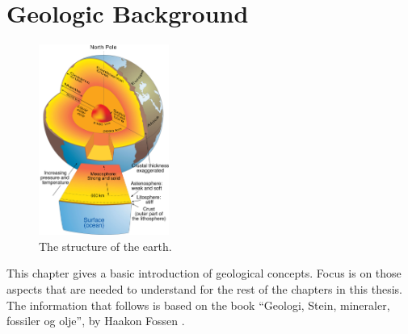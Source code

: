 \documentclass[a4paper,12pt]{report}
\newcommand{\secref}[1]{\autoref{#1}}
\begin{document}
% 
% 
\clearpage


\chapter{Geologic Background}
\label{sec:geology}
\begin{figure}
  \begin{center}
    \includegraphics[width=0.38\textwidth]{thesis/geo/english/indre.jpg}
  \end{center}
  \caption{The structure of the earth.}
  \label{fig:core}
\end{figure}
This chapter gives a basic introduction of geological concepts. Focus is on those aspects that are needed to understand for the rest of the chapters in this thesis. The information that follows is based on the book ``Geologi, Stein, mineraler, fossiler og olje'', by Haakon Fossen \cite{fossen2008geologi}.
\end{document}
